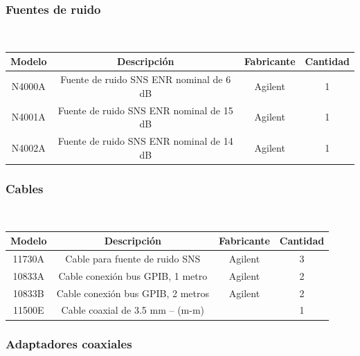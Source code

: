 	\subsubsection{Fuentes de ruido}	
	 	~	 	
	 	
		\begin{table}[h!]
			\centering
						
			\tablefirsthead{}
			\tablehead{}
			\tabletail{}
			\tablelasttail{}
			\begin{tabular}{|c|c|c|c|}
				\hline 
				Modelo 	& 	Descripción & Fabricante & Cantidad \\ 
				\hline
				 N4000A & 	Fuente de ruido SNS ENR nominal de 6 dB & Agilent & 1 \\ 
				\hline
				 N4001A & 	Fuente de ruido SNS ENR nominal de 15 dB & Agilent & 1 \\ 
				\hline
				 N4002A &	Fuente de ruido SNS ENR nominal de 14 dB & Agilent & 1 \\
				\hline
			\end{tabular}
		\end{table}
	
	\subsubsection{Cables}	
		~		
		
		\begin{table}[h!]
			\centering
						
			\tablefirsthead{}
			\tablehead{}
			\tabletail{}
			\tablelasttail{}
			\begin{tabular}{|c|c|c|c|}
				\hline
				 Modelo & Descripción & Fabricante & Cantidad \\
				\hline
				 11730A & Cable para fuente de ruido SNS & Agilent & 3 \\
				\hline
				 10833A & Cable conexión bus GPIB, 1 metro & Agilent & 2 \\
				\hline
				 10833B & Cable conexión bus GPIB, 2 metros & Agilent & 2 \\
				\hline
				 11500E & Cable coaxial de 3.5 mm – (m-m) & 	~	& 1 \\
				\hline
			\end{tabular}
		\end{table}
	
	\subsubsection{Adaptadores coaxiales}	
		~		
		
